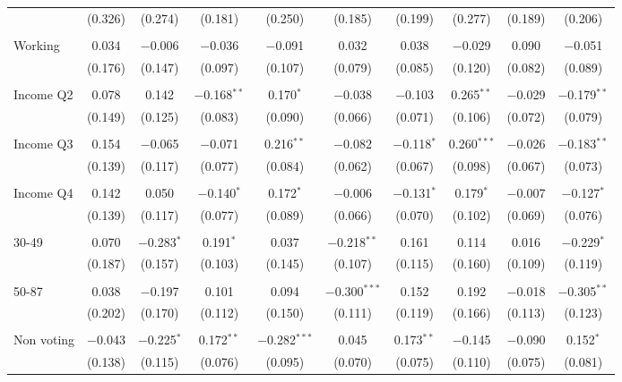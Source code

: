 \begin{tabular}{@{\extracolsep{5pt}}lccccccccc}
  & (0.326) & (0.274) & (0.181) & (0.250) & (0.185) & (0.199) & (0.277) & (0.189) & (0.206) \\ 
  & & & & & & & & & \\ 
 Working & 0.034 & $-$0.006 & $-$0.036 & $-$0.091 & 0.032 & 0.038 & $-$0.029 & 0.090 & $-$0.051 \\ 
  & (0.176) & (0.147) & (0.097) & (0.107) & (0.079) & (0.085) & (0.120) & (0.082) & (0.089) \\ 
  & & & & & & & & & \\ 
 Income Q2 & 0.078 & 0.142 & $-$0.168$^{**}$ & 0.170$^{*}$ & $-$0.038 & $-$0.103 & 0.265$^{**}$ & $-$0.029 & $-$0.179$^{**}$ \\ 
  & (0.149) & (0.125) & (0.083) & (0.090) & (0.066) & (0.071) & (0.106) & (0.072) & (0.079) \\ 
  & & & & & & & & & \\ 
 Income Q3 & 0.154 & $-$0.065 & $-$0.071 & 0.216$^{**}$ & $-$0.082 & $-$0.118$^{*}$ & 0.260$^{***}$ & $-$0.026 & $-$0.183$^{**}$ \\ 
  & (0.139) & (0.117) & (0.077) & (0.084) & (0.062) & (0.067) & (0.098) & (0.067) & (0.073) \\ 
  & & & & & & & & & \\ 
 Income Q4 & 0.142 & 0.050 & $-$0.140$^{*}$ & 0.172$^{*}$ & $-$0.006 & $-$0.131$^{*}$ & 0.179$^{*}$ & $-$0.007 & $-$0.127$^{*}$ \\ 
  & (0.139) & (0.117) & (0.077) & (0.089) & (0.066) & (0.070) & (0.102) & (0.069) & (0.076) \\ 
  & & & & & & & & & \\ 
 30-49 & 0.070 & $-$0.283$^{*}$ & 0.191$^{*}$ & 0.037 & $-$0.218$^{**}$ & 0.161 & 0.114 & 0.016 & $-$0.229$^{*}$ \\ 
  & (0.187) & (0.157) & (0.103) & (0.145) & (0.107) & (0.115) & (0.160) & (0.109) & (0.119) \\ 
  & & & & & & & & & \\ 
 50-87 & 0.038 & $-$0.197 & 0.101 & 0.094 & $-$0.300$^{***}$ & 0.152 & 0.192 & $-$0.018 & $-$0.305$^{**}$ \\ 
  & (0.202) & (0.170) & (0.112) & (0.150) & (0.111) & (0.119) & (0.166) & (0.113) & (0.123) \\ 
  & & & & & & & & & \\ 
 Non voting & $-$0.043 & $-$0.225$^{*}$ & 0.172$^{**}$ & $-$0.282$^{***}$ & 0.045 & 0.173$^{**}$ & $-$0.145 & $-$0.090 & 0.152$^{*}$ \\ 
  & (0.138) & (0.115) & (0.076) & (0.095) & (0.070) & (0.075) & (0.110) & (0.075) & (0.081) \\ 

\end{tabular}
